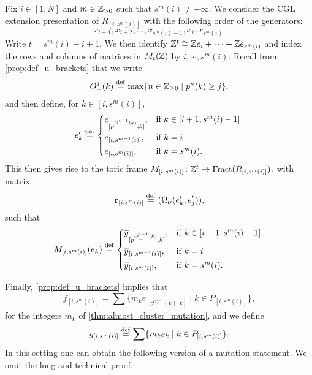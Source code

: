 Fix $i \in [1, N]$ and $m\in \mathbb{Z}_{>0}$ such that $s^m(i) \neq +\infty$. We consider
the CGL extension presentation of $R_{[i, s^m(i)]}$ with the following order of the
generators:
\begin{equation*}
	x_{i+1}, x_{i+2}, \dots, x_{s^m(i) - 1}, x_i, x_{s^m(i)}.
\end{equation*}
%
Write $t = s^m(i)-i +1$. We then identify $\mathbb{Z}^t \cong \mathbb{Z} e_i + \cdots + \mathbb{Z}
	e_{s^m(i)}$ and index the rows and columns of matrices in $M_t(\mathbb{Z})$ by $i, \cdots,
	s^m(i)$. Recall from \cref{prop:def_u_brackets} that we write
\begin{equation*}
	O_{-}^j(k) \overset{\mathrm{def}}{=} \max \{n \in \mathbb{Z}_{\geq 0} \mid p^n(k) \geq j\},
\end{equation*}
%
%
and then define, for $k \in [i, s^m(i)]$,
\begin{equation*}
	e'_k \defeq \begin{dcases*}
		e_{[p^{O^{i+1}_{-}(k)}, k]}, & if $k \in [i+1, s^m(i) - 1]$ \\
		e_{[i, s^{m-1}(i)]},         & if $k=i$                     \\
		e_{[i, s^m(i)]},             & if $k = s^m(i)$.
	\end{dcases*}
\end{equation*}
%
This then gives rise to the toric frame $M_{[i, s^m(i)]}\colon \mathbb{Z}^t \to \operatorname{Fract}(R_{[i,
				s^m(i)]})$, with matrix
\begin{equation*}
	\mathbf{r}_{[i, s^m (i)]} \overset{\mathrm{def}}{=} (\Omega_{\boldsymbol{\nu}}(e'_k,e'_j)),
\end{equation*}
such that
\begin{equation*}
	M_{[i, s^m(i)]}(e_k) \defeq \begin{dcases*}
		\oy_{[p^{O^{i+1}_{-}(k)}, k]}, & if $k \in [i+1, s^m(i) - 1]$ \\
		\oy_{[i, s^{m-1}(i)]},         & if $k=i$                     \\
		\oy_{[i, s^m(i)]},             & if $k = s^m(i)$.
	\end{dcases*}
\end{equation*}
%

Finally, \cref{prop:def_u_brackets} implies that
\begin{equation*}
	f_{[i, s^m(i)]} = \sum\{m_k e_{[p^{O^{i+1}_{-}}(k), k]} \mid k \in P_{[i, s^m(i)]}\},
\end{equation*}
for the integers $m_k$ of \cref{thm:almost_cluster_mutation}, and we define
\begin{equation*}
	g_{[i, s^m(i)]} \overset{\mathrm{def}}{=} \sum\{m_k e_k \mid k \in P_{[i, s^m(i)]}\}.
\end{equation*}
%
In this setting one can obtain the following version of a mutation statement. We omit
the long and technical proof.

